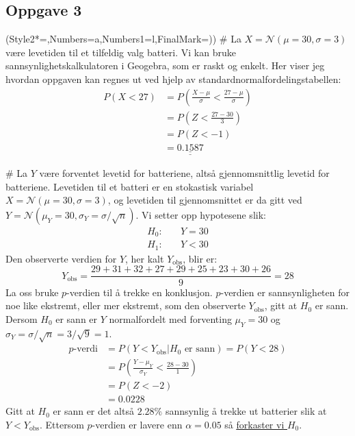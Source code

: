 \documentclass[12pt, a4paper]
{article}						%
\def\answer#1{\underline{\underline{#1}}}
\begin{document}
\subsection*{Oppgave 3}
\begin{easylist}[enumerate]
	\ListProperties(Style2*=,Numbers=a,Numbers1=l,FinalMark={)})
	# La $X = \mathcal{N}(\mu = 30, \sigma = 3)$ være levetiden til  et tilfeldig valg batteri.
	Vi kan bruke sannsynlighetskalkulatoren i Geogebra, som er raskt og enkelt. Her viser jeg hvordan oppgaven kan regnes ut
	ved hjelp av standardnormalfordelingstabellen:
	\begin{align*}
		P(X < 27) &= P\left( \frac{X - \mu}{\sigma} < \frac{27 - \mu}{\sigma} \right) \\
		&= P\left( Z < \frac{27 - 30}{3} \right) \\
		&= P\left( Z < -1 \right) \\
		&=\answer{ 0.1587} 
	\end{align*}
	
	# La $Y$ være forventet levetid for batteriene, altså gjennomsnittlig levetid for batteriene. Levetiden til et batteri er en stokastisk variabel $X = \mathcal{N}(\mu = 30, \sigma = 3)$, og levetiden til gjennomsnittet er da gitt ved $Y = \mathcal{N}(\mu_Y = 30, \sigma_Y = \sigma / \sqrt{n})$. Vi setter opp hypotesene slik:
	\begin{align*}
		H_0 : \quad & Y = 30 \\
		H_1 : \quad & Y < 30 
	\end{align*}
	Den observerte verdien for $Y$, her kalt $Y_{\text{obs}}$, blir er:
	\begin{equation*}
		Y_{\text{obs}} = \frac{29+31+32+27+29+25+23+30+26}{9} = 28
	\end{equation*}
	La oss bruke $p$-verdien til å trekke en konklusjon. $p$-verdien er sannsynligheten for noe like ekstremt, eller mer ekstremt, som den observerte $Y_{\text{obs}}$, gitt at $H_0$ er sann.
	Dersom $H_0$ er sann er $Y$ normalfordelt med forventing $\mu_Y = 30$ og $\sigma_Y = \sigma / \sqrt{n} = 3 /\sqrt{9} = 1$.
	\begin{align*}
		p\text{-verdi} &= P(Y <Y_{\text{obs}} | H_0 \text{ er sann}) = P(Y < 28) \\
		&= P\left( \frac{Y-\mu_Y}{\sigma_Y} < \frac{28-30}{1} \right) \\
		&= P\left( Z < -2 \right) \\
		&= 0.0228
	\end{align*}
	Gitt at $H_0$ er sann er det altså $2.28\%$ sannsynlig å trekke ut batterier
	slik at $Y <Y_{\text{obs}}$. Ettersom $p$-verdien er lavere enn $\alpha = 0.05$
	så \answer{forkaster vi $H_0$}.
\end{easylist}
\end{document}
